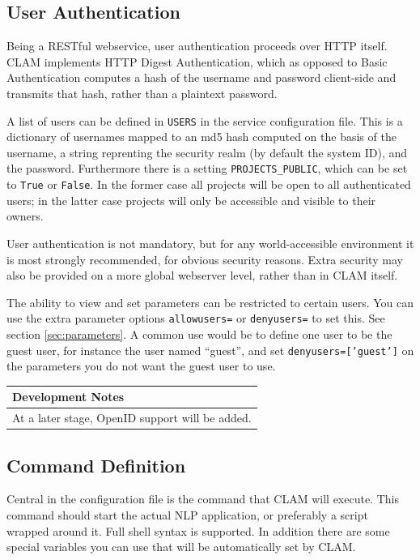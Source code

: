 \documentclass[a4paper,12pt]{report}
\newenvironment{devnotes}
{\newpage
\begin{center}
    \begin{tabular}[h!]{|p{0.8\textwidth}|}
    \hline
    {\bf Development Notes}\\\hline}
{   \\\hline
    \end{tabular}
\end{center}}
\begin{document}
\subsection{User Authentication}

Being a RESTful webservice, user authentication proceeds over HTTP itself. CLAM implements HTTP Digest Authentication, which as opposed to Basic Authentication computes a hash of the username and password client-side and transmits that hash, rather than a plaintext password. 

A list of users can be defined in \texttt{USERS} in the service configuration file. This is a dictionary of usernames mapped to an md5 hash computed on the basis of the username, a string reprenting the security realm (by default the system ID), and the password. Furthermore there is a setting \texttt{PROJECTS\_PUBLIC}, which can be set to \texttt{True} or \texttt{False}. In the former case all projects will be open to all authenticated users; in the latter case projects will only be accessible and visible to their owners.

User authentication is not mandatory, but for any world-accessible environment it is most strongly recommended, for obvious security reasons. Extra security may also be provided on a more global webserver level, rather than in CLAM itself.

The ability to view and set parameters can be restricted to certain users. You can use the extra parameter options \texttt{allowusers=} or \texttt{denyusers=} to set this. See section \ref{sec:parameters}. A common use would be to define one user to be the guest user, for instance the user named ``guest'', and set \texttt{denyusers=['guest']} on the parameters you do not want the guest user to use.

\begin{devnotes}
At a later stage, OpenID support will be added.
\end{devnotes}


\subsection{Command Definition}
\label{sec:command}

Central in the configuration file is the command that CLAM will execute. This command should start the actual NLP application, or preferably a script wrapped around it. Full shell syntax is supported. In addition there are some special variables you can use that will be automatically set by CLAM. 
\end{document}
